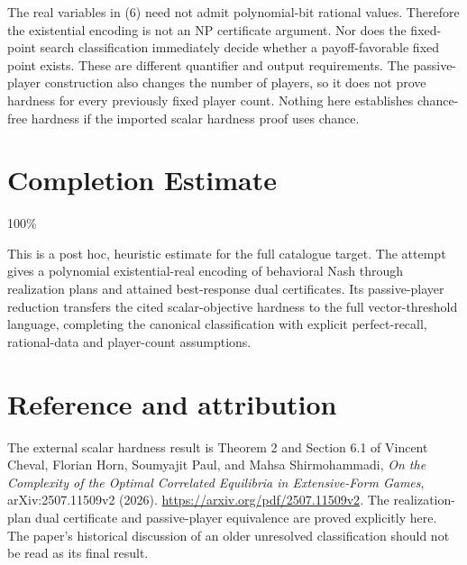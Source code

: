 \documentclass[11pt]{article}
\begin{document}
The real variables in (6) need not admit polynomial-bit rational values.
Therefore the existential encoding is not an NP certificate argument.
Nor does the fixed-point search classification immediately decide whether
a payoff-favorable fixed point exists. These are different quantifier
and output requirements. The passive-player construction also changes
the number of players, so it does not prove hardness for every previously
fixed player count. Nothing here establishes chance-free hardness if
the imported scalar hardness proof uses chance.

\section{Completion Estimate}
100\%

This is a post hoc, heuristic estimate for the full catalogue target.
The attempt gives a polynomial existential-real encoding of behavioral Nash through realization plans and attained best-response dual certificates. Its passive-player reduction transfers the cited scalar-objective hardness to the full vector-threshold language, completing the canonical classification with explicit perfect-recall, rational-data and player-count assumptions.

\section*{Reference and attribution}
The external scalar hardness result is Theorem 2 and Section 6.1 of
Vincent Cheval, Florian Horn, Soumyajit Paul, and Mahsa Shirmohammadi,
\emph{On the Complexity of the Optimal Correlated Equilibria in
Extensive-Form Games}, arXiv:2507.11509v2 (2026).
\url{https://arxiv.org/pdf/2507.11509v2}.
The realization-plan dual certificate and passive-player equivalence
are proved explicitly here. The paper's historical discussion of an
older unresolved classification should not be read as its final result.
\end{document}
